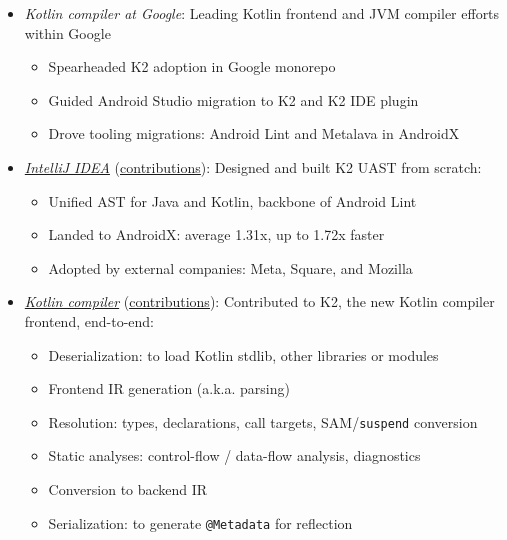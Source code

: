 \documentclass[9pt,letter,ragged2e,withhyper]{altacv}
\begin{document}
\begin{paracol}{2}



\begin{itemize}
\item\emph{Kotlin compiler at Google}:
Leading Kotlin frontend and JVM compiler efforts within Google
\begin{itemize}
\item Spearheaded K2 adoption in Google monorepo
\item Guided Android Studio migration to K2 and K2 IDE plugin
\item Drove tooling migrations: Android Lint and Metalava in AndroidX
\end{itemize}
\end{itemize}

\divider

\begin{itemize}
\item\emph{\href{https://github.com/JetBrains/intellij-community}{IntelliJ IDEA}} (\href{https://github.com/JetBrains/intellij-community/commits?author=jsjeon}{\underline{contributions}}):
Designed and built K2 UAST from scratch:
\begin{itemize}
\item Unified AST for Java and Kotlin, backbone of Android Lint
\item Landed to AndroidX: average 1.31x, up to 1.72x faster
\item Adopted by external companies: Meta, Square, and Mozilla
\end{itemize}
\item\emph{\href{https://github.com/JetBrains/kotlin}{Kotlin compiler}} (\href{https://github.com/JetBrains/kotlin/commits?author=jsjeon}{\underline{contributions}}):
Contributed to K2, the new Kotlin compiler frontend, end-to-end:
\begin{itemize}
\item Deserialization: to load Kotlin stdlib, other libraries or modules
\item Frontend IR generation (a.k.a. parsing)
\item Resolution: types, declarations, call targets, SAM/\texttt{suspend} conversion
\item Static analyses: control-flow / data-flow analysis, diagnostics
\item Conversion to backend IR
\item Serialization: to generate \texttt{@Metadata} for reflection
\end{itemize}
\end{itemize}


\end{paracol}
\end{document}
